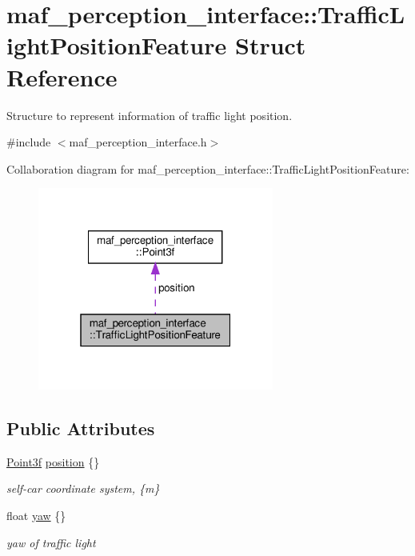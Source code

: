 \hypertarget{structmaf__perception__interface_1_1TrafficLightPositionFeature}{}\section{maf\+\_\+perception\+\_\+interface\+:\+:Traffic\+Light\+Position\+Feature Struct Reference}
\label{structmaf__perception__interface_1_1TrafficLightPositionFeature}


Structure to represent information of traffic light position.  




{\ttfamily \#include $<$maf\+\_\+perception\+\_\+interface.\+h$>$}



Collaboration diagram for maf\+\_\+perception\+\_\+interface\+:\+:Traffic\+Light\+Position\+Feature\+:\nopagebreak
\begin{figure}[H]
\begin{center}
\leavevmode
\includegraphics[width=220pt]{structmaf__perception__interface_1_1TrafficLightPositionFeature__coll__graph}
\end{center}
\end{figure}
\subsection*{Public Attributes}
\begin{DoxyCompactItemize}
\item 
\hyperlink{structmaf__perception__interface_1_1Point3f}{Point3f} \hyperlink{structmaf__perception__interface_1_1TrafficLightPositionFeature_a48af67c970f1b599b374c3d54d67849d}{position} \{\}
\begin{DoxyCompactList}\small\item\em self-\/car coordinate system, \{m\} \end{DoxyCompactList}\item 
float \hyperlink{structmaf__perception__interface_1_1TrafficLightPositionFeature_a66949b002ea0a22bd85b7034a405aad6}{yaw} \{\}
\begin{DoxyCompactList}\small\item\em yaw of traffic light \end{DoxyCompactList}\end{DoxyCompactItemize}


